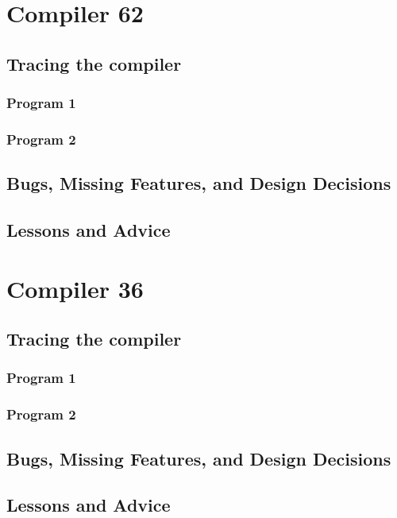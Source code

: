 
	\chapter*{Compiler 62}

	\section{Tracing the compiler}

	\subsection{Program 1}

	\subsection{Program 2}

	\section{Bugs, Missing Features, and Design Decisions}

	\section{Lessons and Advice}

	\chapter*{Compiler 36}

	\section{Tracing the compiler}

	\subsection{Program 1}

	\subsection{Program 2}

	\section{Bugs, Missing Features, and Design Decisions}

	\section{Lessons and Advice}



